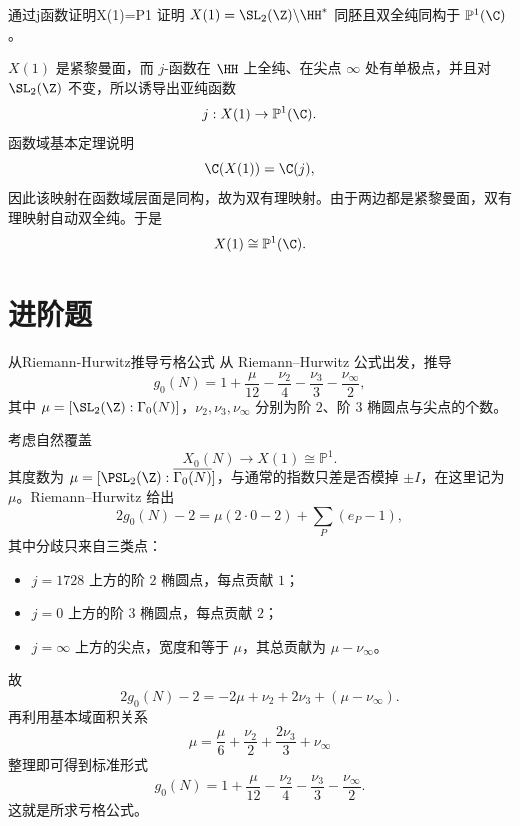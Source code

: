 \begin{problem}{通过j函数证明X(1)=P1}
证明 $X(1)=\SL_2(\Z)\backslash\HH^*$ 同胚且双全纯同构于 $\mathbb{P}^1(\C)$。
\end{problem}
\begin{solution}
$X(1)$ 是紧黎曼面，而 $j$-函数在 $\HH$ 上全纯、在尖点 $\infty$ 处有单极点，并且对 $\SL_2(\Z)$ 不变，所以诱导出亚纯函数
\[
j:X(1)\to\mathbb{P}^1(\C).
\]
函数域基本定理说明
\[
\C(X(1))=\C(j),
\]
因此该映射在函数域层面是同构，故为双有理映射。由于两边都是紧黎曼面，双有理映射自动双全纯。于是
\[
X(1)\cong\mathbb{P}^1(\C).
\]
\end{solution}

\section{进阶题 \medium}

\begin{problem}{从Riemann-Hurwitz推导亏格公式}
从 Riemann--Hurwitz 公式出发，推导
\[
g_0(N)=1+\frac{\mu}{12}-\frac{\nu_2}{4}-\frac{\nu_3}{3}-\frac{\nu_\infty}{2},
\]
其中 $\mu=[\SL_2(\Z):\Gamma_0(N)]$，$\nu_2,\nu_3,\nu_\infty$ 分别为阶 $2$、阶 $3$ 椭圆点与尖点的个数。
\end{problem}
\begin{solution}
考虑自然覆盖
\[
X_0(N)\longrightarrow X(1)\cong\mathbb{P}^1.
\]
其度数为 $\mu=[\PSL_2(\Z):\overline{\Gamma_0(N)}]$，与通常的指数只差是否模掉 $\pm I$，在这里记为 $\mu$。Riemann--Hurwitz 给出
\[
2g_0(N)-2=\mu(2\cdot0-2)+\sum_P(e_P-1),
\]
其中分歧只来自三类点：
\begin{itemize}
\item $j=1728$ 上方的阶 $2$ 椭圆点，每点贡献 $1$；
\item $j=0$ 上方的阶 $3$ 椭圆点，每点贡献 $2$；
\item $j=\infty$ 上方的尖点，宽度和等于 $\mu$，其总贡献为 $\mu-\nu_\infty$。
\end{itemize}
故
\[
2g_0(N)-2=-2\mu+\nu_2+2\nu_3+(\mu-\nu_\infty).
\]
再利用基本域面积关系
\[
\mu=\frac{\mu}{6}+\frac{\nu_2}{2}+\frac{2\nu_3}{3}+\nu_\infty
\]
整理即可得到标准形式
\[
g_0(N)=1+\frac{\mu}{12}-\frac{\nu_2}{4}-\frac{\nu_3}{3}-\frac{\nu_\infty}{2}.
\]
这就是所求亏格公式。
\end{solution}

